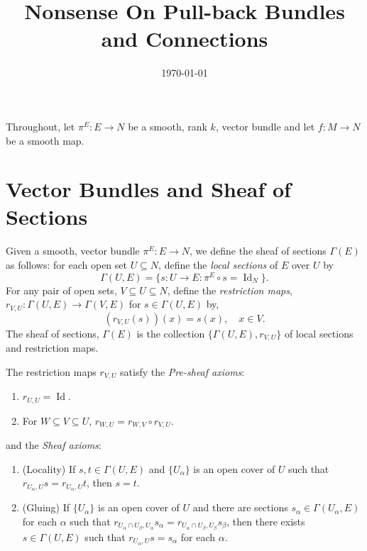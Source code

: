 \documentclass{amsart}
\begin{document}
\title[Pull-back Bundle Nonsense]
 {Nonsense On Pull-back Bundles and Connections}

\curraddr{}
\email{}
\date{\today}

\dedicatory{}
\subjclass[2010]{}
\keywords{}

\maketitle

Throughout, let \(\pi^E : E \to N\) be a smooth, rank \(k\), vector bundle and let \(f : M \to N\) be a smooth map.

\section{Vector Bundles and Sheaf of Sections}

\begin{defn}
Given a smooth, vector bundle \(\pi^E : E \to N\), we define the sheaf of sections \(\Gamma(E)\) as follows: for each open set \(U \subseteq N\), define the \emph{local sections} of \(E\) over \(U\) by
\[
\Gamma(U, E) = \{s : U \to E : \pi^E \circ s = \operatorname{Id}_N\}.
\]
For any pair of open sets, \(V \subseteq U \subseteq N\), define the \emph{restriction maps}, \(r_{V,U} : \Gamma(U, E) \to \Gamma(V, E)\) for \(s \in \Gamma(U, E)\) by,
\[
(r_{V,U} (s)) (x) = s(x), \quad x \in V.
\]
The sheaf of sections, \(\Gamma(E)\) is the collection \(\{\Gamma(U, E), r_{V,U}\}\) of local sections and restriction maps.
\end{defn}

\begin{rem}
The restriction maps \(r_{V,U}\) satisfy the \emph{Pre-sheaf axioms}:
\begin{enumerate}
\item \(r_{U,U} = \operatorname{Id}\).
\item For \(W \subseteq V \subseteq U\), \(r_{W,U} = r_{W,V} \circ r_{V,U}\).
\end{enumerate}
and the \emph{Sheaf axioms}:
\begin{enumerate}
\item (Locality) If \(s, t \in \Gamma(U, E)\) and \(\{U_{\alpha}\}\) is an open cover of \(U\) such that \(r_{U_{\alpha},U} s = r_{U_{\alpha},U} t\), then \(s = t\).
\item (Gluing) If \(\{U_{\alpha}\}\) is an open cover of \(U\) and there are sections \(s_{\alpha} \in \Gamma(U_{\alpha}, E)\) for each \(\alpha\) such that \(r_{U_{\alpha} \cap U_{\beta},U_{\alpha}} s_{\alpha} = r_{U_{\alpha} \cap U_{\beta},U_{\beta}} s_{\beta}\), then there exists \(s \in \Gamma(U, E)\) such that \(r_{U_{\alpha},U} s = s_{\alpha}\) for each \(\alpha\).
\end{enumerate}
\end{rem}
\end{document}

